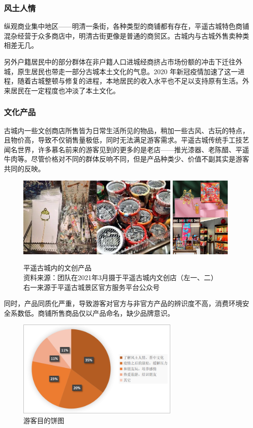 \documentclass[UTF8]{ctexart}
\begin{document}
        \subsubsection{风土人情}
纵观商业集中地区——明清一条街，各种类型的商铺都有存在，平遥古城特色商铺混杂经营于众多商店中，明清古街更像是普通的商贸区。古城内与古城外售卖种类相差无几。

另外户籍居民中的部分群体在非户籍人口进城经商挤占市场份额的冲击下迁往外城，原生居民也带走一部分古城本土文化的气息。2020 年新冠疫情加速了这一进程，随着古城整顿与修复的进程，本地居民的收入水平也不足以支持原有生活。外来居民在一定程度也冲淡了本土文化。
        \subsubsection{文化产品}
古城内一些文创商店所售皆为日常生活所见的物品，稍加一些古风、古玩的特点，且物价高，导致不仅销售量极低，同时无法满足游客需求。平遥古城传统手工技艺闻名世界，许多慕名前来的游客见到的更多的是老店——推光漆器、老陈醋、平遥牛肉等。尽管价格对不同的群体反响不同，但是产品种类少、价值不副其实是游客共同的反映。
\begin{figure}[H]
    \centering
    \includegraphics[width=8cm]{文创1.jpeg}
    \includegraphics[width=3cm]{文创拼图.jpg}
    \caption[plain]{平遥古城内的文创产品\\资料来源：团队在2021年3月摄于平遥古城内文创店（左一、二）\\右一来源于平遥古城景区官方服务平台公众号}
    \label{fig:my_label}
\end{figure}
同时，产品同质化严重，导致游客对官方与非官方产品的辨识度不高，消费环境安全系数低。商铺所售商品仅以产品命名，缺少品牌意识。
\begin{figure}[H]
    \centering
    \includegraphics[width=8cm]{游客目的.png}
    \caption{游客目的饼图}
    \label{fig:my_label}
\end{figure}
\end{document}

